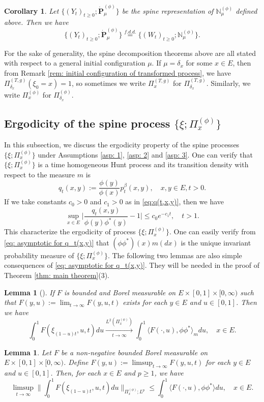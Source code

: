 \documentclass[12pt, a4paper]{amsart}
\newtheorem{lem}[thm]{Lemma}
\newtheorem{cro}[thm]{Corollary}
\theoremstyle{definition}
\numberwithin{equation}{section}
\begin{document}
\begin{cro}
	Let $\{(Y_t)_{t\geq 0}; \dot {\mathbf P}^{(\phi)}_\mu\}$ be the spine representation of $\mathbb N^{(\phi)}_\mu$ defined above.
	Then we have
\[
	\{(Y_t)_{t\geq 0}; \dot{\mathbf P}^{(\phi)}_\mu\}
	\overset{f.d.d.}{=} \{(W_t)_{t\geq 0}; \mathbb N_\mu^{(\phi)}\}.
\]
\end{cro}

	For the sake of generality, the spine decomposition theorems above are all stated with respect to a general initial configuration $\mu$.
	If $\mu = \delta_x$ for some $x\in E$, then from Remark \ref{rem: initial configuration of transformed process}, we have $\Pi_{\delta_x}^{(T,g)} (\xi_0 = x) = 1$, so sometimes we write $\Pi_x^{(T,g)}$ for $\Pi_{\delta_x}^{(T,g)}$.
	Similarly, we write $\Pi_x^{(\phi)}$ for $\Pi_{\delta_x}^{(\phi)}$.

\subsection{Ergodicity of the spine process $\{\xi; \Pi^{(\phi)}_x\}$}
\label{sec: Ergodicity}
	In this subsection, we discuss the ergodicity property of the spine processes $\{\xi; \Pi^{(\phi)}_x\}$ under Assumptions \ref{asp: 1}, \ref{asp: 2} and \ref{asp: 3}.
	One can verify that $\{\xi; \Pi^{(\phi)}_x\}$ is a time homogeneous Hunt process and its transition density with respect to the measure $m$ is
\[
	q_t(x,y) := \frac{\phi(y)}{\phi(x)} p^\beta_t(x,y),
	\quad x,y\in E, t>0.
\]
	If we take constants $c_0>0$ and $c_1>0$ as in \eqref{eq:q(t,x,y)}, then we have
\[\label{eq: asymptotic for q_t(x,y)}
	\sup_{x\in E} \Big| \frac{q_t(x,y)}{\phi(y)\phi^*(y)} - 1\Big|
	\leq c_0 e^{-c_1 t},
	\quad t > 1.
\]
	This characterize the ergodicity of process $\{\xi; \Pi^{(\phi)}_x\}$.
	One can easily verify from \eqref{eq: asymptotic for q_t(x,y)} that $(\phi\phi^*)(x)m(dx)$ is the unique invariant probability measure of $\{\xi; \Pi^{(\phi)}_x\}$.
	The following two lemmas are also simple consequences of \eqref{eq: asymptotic for q_t(x,y)}.
	They will be needed in the proof of  Theorem \ref{thm: main theorem}(3).
\begin{lem}[{\cite[Lemma 5.6]{RenSongSun2017Spine}}] \label{lem: ergodicity of the underlying process}
	If $F$ is bounded and Borel measurable on $E\times [0,1]\times [0,\infty)$ such that $F(y,u):= \lim_{t\to \infty} F(y,u,t)$ exists for each $y\in E$ and $u \in [0,1]$.
	Then we have
\[
	\int_0^1 F(\xi_{(1-u)t},u,t) du
\xrightarrow[t\to \infty]{ L^2(\Pi_x^{(\phi)})} 
\int_0^1 \langle F(\cdot , u), \phi\phi^*\rangle_m du,
	\quad x\in E.
\]
\end{lem}
\begin{lem}\label{lem: Fatou-ergodic lemma for the uderlying process}
	Let $F$ be a non-negative bounded Borel measurable on $E\times [0,1]\times [0,\infty)$.
	Define $F(y,u):= \limsup_{t\to \infty} F(y,u,t)$ for each $y\in E$ and $u \in [0,1]$.
	Then, for each $x\in E$ and $p \geq 1$, we have
\[
	\limsup_{ t \to \infty}  \Big\| \int_0^1 F(\xi_{(1-u) t },u,t) du  \Big\|_{\Pi_x^{(\phi)};L^p}
	\leq \int_0^1 \langle F(\cdot, u), \phi \phi^*\rangle du,
	\quad x\in E.
\]
\end{lem}
\end{document}

